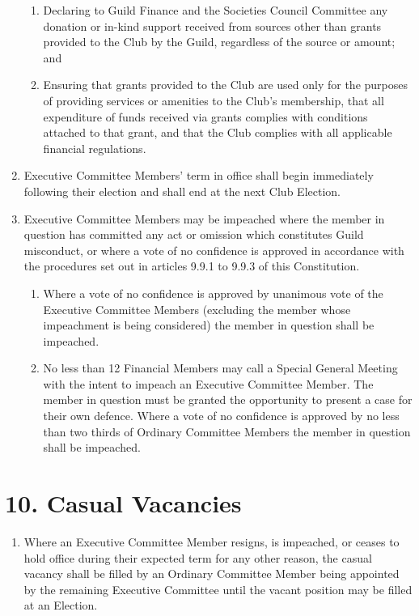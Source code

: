 \documentclass[12pt]{article}
\begin{document}
\begin{enumerate}[label=9.\arabic*]
\begin{enumerate}[label=\theenumi.\arabic*]
        \item Declaring to Guild Finance and the Societies Council Committee any donation or in-kind support received from sources other than grants provided to the Club by the Guild, regardless of the source or amount; and
        \item Ensuring that grants provided to the Club are used only for the purposes of providing services or amenities to the Club's membership, that all expenditure of funds received via grants complies with conditions attached to that grant, and that the Club complies with all applicable financial regulations.
    \end{enumerate}
\item Executive Committee Members' term in office shall begin immediately following their election and shall end at the next Club Election.
\item Executive Committee Members may be impeached where the member in question has committed any act or omission which constitutes Guild misconduct, or where a vote of no confidence is approved in accordance with the procedures set out in articles 9.9.1 to 9.9.3 of this Constitution.
    \begin{enumerate}[label=\theenumi.\arabic*]
        \item Where a vote of no confidence is approved by unanimous vote of the Executive Committee Members (excluding the member whose impeachment is being considered) the member in question shall be impeached.
        \item No less than 12 Financial Members may call a Special General Meeting with the intent to impeach an Executive Committee Member. The member in question must be granted the opportunity to present a case for their own defence. Where a vote of no confidence is approved by no less than two thirds of Ordinary Committee Members the member in question shall be impeached.
    \end{enumerate}
\end{enumerate}

\section{10. Casual Vacancies}
\begin{enumerate}[label=10.\arabic*]
 \item Where an Executive Committee Member resigns, is impeached, or ceases to hold office during their expected term for any other reason, the casual vacancy shall be filled by an Ordinary Committee Member being appointed by the remaining Executive Committee until the vacant position may be filled at an Election. 
\end{enumerate}
%
\end{document}
